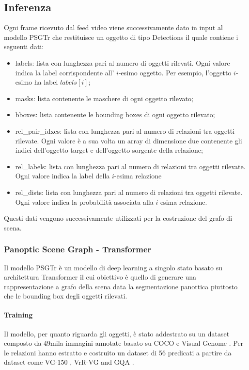 \subsection{Inferenza}
Ogni frame ricevuto dal feed video viene successivamente dato in input al modello PSGTr \cite{yang2022psg} che restituisce un oggetto di tipo Detections il quale contiene i seguenti dati:
\begin{itemize}
	\item labels: lista con lunghezza pari al numero di oggetti rilevati. Ogni valore indica la label corrispondente all' $i$-esimo oggetto. Per esempio, l'oggetto $i$-esimo ha label $labels[i]$;
	\item masks: lista contenente le maschere di ogni oggetto rilevato;
	\item bboxes: lista contenente le bounding boxes di ogni oggetto rilevato;
	\item rel\_pair\_idxes: lista con lunghezza pari al numero di relazioni tra oggetti rilevate. Ogni valore è a sua volta un array di dimensione due contenente gli indici dell'oggetto target e dell'oggetto sorgente della relazione;
	\item rel\_labels: lista con lunghezza pari al numero di relazioni tra oggetti rilevate. Ogni valore indica la label della $i$-esima relazione
	\item rel\_dists: lista con lunghezza pari al numero di relazioni tra oggetti rilevate. Ogni valore indica la probabilità associata alla $i$-esima relazione.
\end{itemize}
Questi dati vengono successivamente utilizzati per la costruzione del grafo di scena.

\subsubsection{Panoptic Scene Graph - Transformer}
Il modello PSGTr \cite{yang2022psg} è un modello di deep learning a singolo stato basato su architettura Transformer \cite{transformer} il cui obiettivo è quello di generare una rappresentazione a grafo della scena data la segmentazione panottica piuttosto che le bounding box degli oggetti rilevati.
\paragraph*{Training}
Il modello, per quanto riguarda gli oggetti, è stato addestrato su un dataset composto da 49mila immagini annotate basato su COCO \cite{coco} e Visual Genome \cite{visualgenemo}. Per le relazioni hanno estratto e costruito un dataset di 56 predicati a partire da dataset come VG-150 \cite{vg150}, VrR-VG \cite{vrvvg} and GQA \cite{cqa}.

